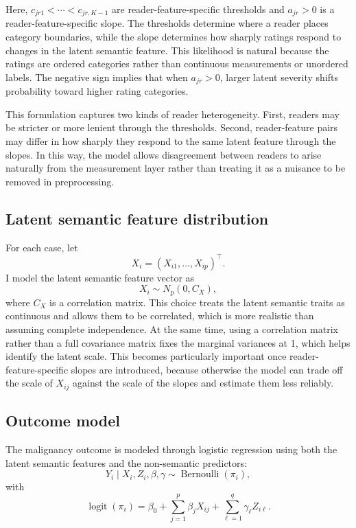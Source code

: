 \documentclass[twoside,11pt]{article}
\begin{document}
Here, $c_{jr1} < \cdots < c_{jr,K-1}$ are reader-feature-specific thresholds and $a_{jr}>0$ is a reader-feature-specific slope. The thresholds determine where a reader places category boundaries, while the slope determines how sharply ratings respond to changes in the latent semantic feature. This likelihood is natural because the ratings are ordered categories rather than continuous measurements or unordered labels. The negative sign implies that when $a_{jr}>0$, larger latent severity shifts probability toward higher rating categories.

This formulation captures two kinds of reader heterogeneity. First, readers may be stricter or more lenient through the thresholds. Second, reader-feature pairs may differ in how sharply they respond to the same latent feature through the slopes. In this way, the model allows disagreement between readers to arise naturally from the measurement layer rather than treating it as a nuisance to be removed in preprocessing.

\subsection{Latent semantic feature distribution}

For each case, let
\[
X_i = (X_{i1},\dots,X_{ip})^\top.
\]
I model the latent semantic feature vector as
\[
X_i \sim N_p(0,C_X),
\]
where $C_X$ is a correlation matrix. This choice treats the latent semantic traits as continuous and allows them to be correlated, which is more realistic than assuming complete independence. At the same time, using a correlation matrix rather than a full covariance matrix fixes the marginal variances at 1, which helps identify the latent scale. This becomes particularly important once reader-feature-specific slopes are introduced, because otherwise the model can trade off the scale of $X_{ij}$ against the scale of the slopes and estimate them less reliably.

\subsection{Outcome model}

The malignancy outcome is modeled through logistic regression using both the latent semantic features and the non-semantic predictors:
\[
Y_i \mid X_i,Z_i,\beta,\gamma \sim \operatorname{Bernoulli}(\pi_i),
\]
with
\[
\operatorname{logit}(\pi_i)
=
\beta_0 + \sum_{j=1}^p \beta_j X_{ij} + \sum_{\ell=1}^q \gamma_\ell Z_{i\ell}.
\]
\end{document}
